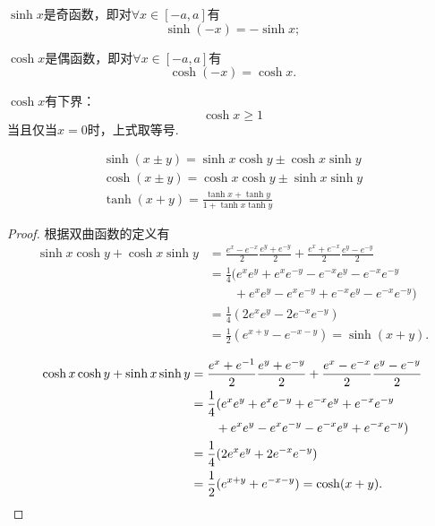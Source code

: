 \begin{property}
\(\sinh x\)是奇函数，即对\(\forall x \in [-a,a]\)有\[
\sinh(-x) = -\sinh x;
\]

\(\cosh x\)是偶函数，即对\(\forall x \in [-a,a]\)有\[
\cosh(-x) = \cosh x.
\]
\end{property}

\begin{property}
\(\cosh{x}\)有下界：\[
\cosh{x} \geqslant 1
\]当且仅当\(x=0\)时，上式取等号.
\end{property}

\begin{theorem}
\begin{gather}
\sinh(x \pm y) = \sinh{x}\cosh{y} \pm \cosh{x}\sinh{y} \\
\cosh(x \pm y) = \cosh{x}\cosh{y} \pm \sinh{x}\sinh{y} \\
\tanh(x + y) = \frac{\tanh{x} + \tanh{y}}{1 + \tanh{x}\tanh{y}}
\end{gather}
\begin{proof}
根据双曲函数的定义有
\begin{align*}
\sinh{x}\cosh{y}+\cosh{x}\sinh{y}
&= \frac{e^x - e^{-x}}{2} \frac{e^y + e^{-y}}{2} + \frac{e^x + e^{-x}}{2} \frac{e^y - e^{-y}}{2} \\
&= \frac{1}{4} (e^x e^y + e^x e^{-y} - e^{-x} e^y - e^{-x} e^{-y} \\
&\qquad+ e^x e^y - e^x e^{-y} + e^{-x} e^y - e^{-x} e^{-y}) \\
&= \frac{1}{4} (2 e^x e^y - 2 e^{-x} e^{-y}) \\
&= \frac{1}{2} (e^{x+y} - e^{-x-y}) = \sinh(x+y).
\end{align*}

\begin{align*}
\cosh{x}\cosh{y}+\sinh{x}\sinh{y}
&= \frac{e^x + e^{-1}}{2} \frac{e^y + e^{-y}}{2} + \frac{e^x - e^{-x}}{2} \frac{e^y - e^{-y}}{2} \\
&= \frac{1}{4} (e^x e^y + e^x e^{-y} + e^{-x} e^y + e^{-x} e^{-y} \\
&\qquad+ e^x e^y - e^x e^{-y} - e^{-x} e^y + e^{-x} e^{-y}) \\
&= \frac{1}{4} (2 e^x e^y + 2 e^{-x} e^{-y}) \\
&= \frac{1}{2} (e^{x+y} + e^{-x-y}) = \cosh(x+y).
\qedhere
\end{align*}
\end{proof}
\end{theorem}

